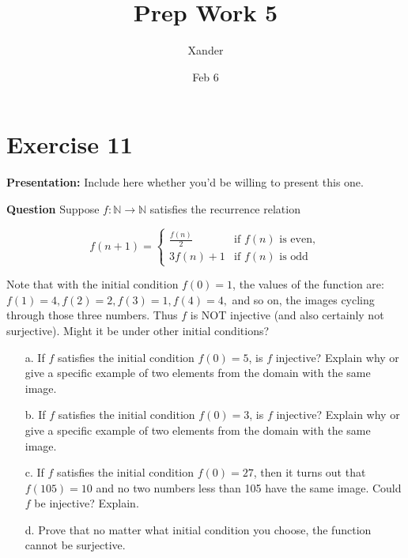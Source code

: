 \documentclass{article}
\title{Prep Work 5}
\author{Xander}
\date{Feb 6}
\begin{document}
\maketitle



\section*{Exercise 11}  

\noindent\textbf{Presentation:} Include here whether you'd be willing to present this one. 

\vspace{0.5cm} %

\noindent\textbf{Question}
Suppose \( f : \mathbb{N} \rightarrow \mathbb{N} \) satisfies the recurrence relation

\[
f(n + 1) = \begin{cases} 
\frac{f(n)}{2} & \text{if } f(n) \text{ is even}, \\
3f(n) + 1 & \text{if } f(n) \text{ is odd}
\end{cases}
\]

Note that with the initial condition \( f(0) = 1 \), the values of the function are:
\( f(1) = 4, f(2) = 2, f(3) = 1, f(4) = 4, \) and so on, the images cycling through
those three numbers. Thus \( f \) is NOT injective (and also certainly not surjective).
Might it be under other initial conditions?

\begin{enumerate}
    \item[a.] If \( f \) satisfies the initial condition \( f(0) = 5 \), is \( f \) injective? Explain why or give a specific example of two elements from the domain with the same image.

    \item[b.] If \( f \) satisfies the initial condition \( f(0) = 3 \), is \( f \) injective? Explain why or give a specific example of two elements from the domain with the same image.

    \item[c.] If \( f \) satisfies the initial condition \( f(0) = 27 \), then it turns out that \( f(105) = 10 \) and no two numbers less than 105 have the same image. Could \( f \) be injective? Explain.

    \item[d.] Prove that no matter what initial condition you choose, the function cannot be surjective.
\end{enumerate}
\end{document}
